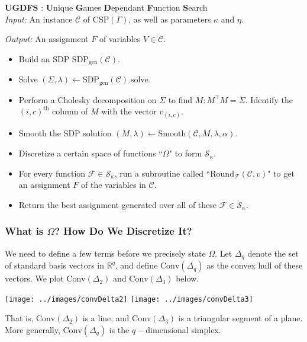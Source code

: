 \documentclass[letterpaper, 12pt]{article}
\numberwithin{equation}{section}
\begin{document}
\begin{algorithm} \textbf{UGDFS} : \textbf{U}nique \textbf{G}ames \textbf{D}ependant \textbf{F}unction \textbf{S}earch \\

\textit{Input: } An instance $\mathcal{C}$ of $\text{CSP}(\Gamma)$, as well as parameters $\kappa$ and $\eta$.

\textit{Output: } An assignment $F$ of variables $V \in \mathcal{C}$.
\begin{itemize}
\item Build an SDP $\text{SDP}_{\text{gen}}(\mathcal{C})$.
\item Solve $(\Sigma,\lambda) \leftarrow \text{SDP}_{\text{gen}}(\mathcal{C}).\text{solve}$.
\item Perform a Cholesky decomposition on $\Sigma$ to find $M : M^\intercal M = \Sigma$. Identify the $(i,c)^{\text{th}}$ column of $M$ with the vector $v_{(i,c)}$.
\item Smooth the SDP solution $(M,\lambda) \leftarrow \text{Smooth}(\mathcal{C},M,\lambda, \alpha)$.
\item Discretize a certain space of functions ``$\Omega$" to form $\mathcal{S}_{\kappa}$.
\item For every function $\mathcal{F} \in \mathcal{S}_{\kappa}$, run a subroutine called ``$\text{Round}_{\mathcal{F}}(\mathcal{C},v)$" to get an assignment $F$ of the variables in $\mathcal{C}$. 
\item Return the best assignment generated over all of these $\mathcal{F} \in \mathcal{S}_{\kappa}$.
\end{itemize}
\end{algorithm}

\subsubsection{What is $\Omega$? How Do We Discretize It?}\label{subsubsec:UGDFS_discretize}
We need to define a few terms before we precisely state $\Omega$. Let $\Delta_q$ denote the set of standard basis vectors in $\mathbb{R}^q$, and define $\text{Conv}(\Delta_q)$ as the convex hull of these vectors. We plot $\text{Conv}(\Delta_2)$ and $\text{Conv}(\Delta_3)$ below.

\begin{center}
\texttt{[image: ../images/convDelta2]} \qquad
\texttt{[image: ../images/convDelta3]}
\end{center}

That is, $\text{Conv}(\Delta_2)$ is a line, and $\text{Conv}(\Delta_3)$ is a triangular segment of a plane. More generally, $\text{Conv}(\Delta_q)$ is the $q-$dimensional simplex.
\end{document}
